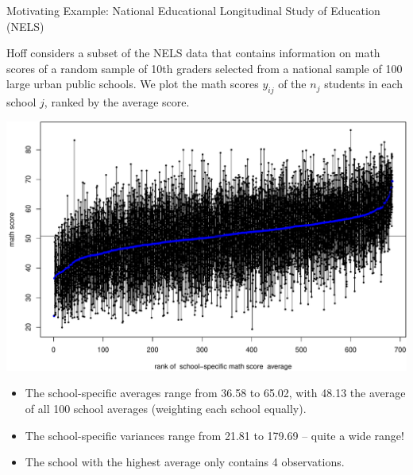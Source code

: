 \documentclass[ignorenonframetext,]{beamer}
\begin{document}
\begin{frame}{Motivating Example: National Educational Longitudinal
Study of Education (NELS)}

Hoff considers a subset of the NELS data that contains information on
math scores of a random sample of 10th graders selected from a national
sample of 100 large urban public schools. We plot the math scores
\(y_{ij}\) of the \(n_j\) students in each school \(j\), ranked by the
average score.

\end{frame}

\begin{frame}{}

\includegraphics{anova_06_deck_files/figure-beamer/nelsplot1-1.pdf}

\end{frame}

\begin{frame}{}

\begin{itemize}
\item
  The school-specific averages range from 36.58 to 65.02, with 48.13 the
  average of all 100 school averages (weighting each school equally).
\item
  The school-specific variances range from 21.81 to 179.69 -- quite a
  wide range!
\item
  The school with the highest average only contains 4 observations.
\end{itemize}

\end{frame}
\end{document}

